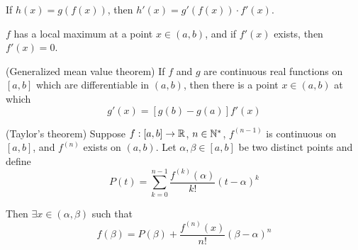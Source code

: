     \begin{theo}
        If $h(x) = g(f(x))$, then $h'(x) = g'(f(x)) \cdot f'(x)$.
    \end{theo}

    \begin{theo}
        $f$ has a local maximum at a point $x \in (a, b)$, and if $f'(x)$ exists, then $f'(x) = 0$.
    \end{theo}

    \begin{theo}
        (Generalized mean value theorem) If $f$ and $g$ are continuous real functions on $[a,b]$ which are differentiable in $(a,b)$, then there is a point $x \in (a,b)$ at which 
        \begin{equation}
            [f(b)-f(a)] g'(x) = [g(b)-g(a)] f'(x)
        \end{equation}
    \end{theo}

    \begin{theo}
        (Taylor's theorem) Suppose $f : [a,b] \to \mathbb{R}$, $n \in \mathbb{N}^*$, $f^{(n-1)}$ is continuous on $[a,b]$, and $f^{(n)}$ exists on $(a,b)$. Let $\alpha, \beta \in [a,b]$ be two distinct points and define
        \begin{equation}
            P(t) = \sum_{k=0}^{n-1} \frac{f^{(k)}(\alpha)}{k!} (t-\alpha)^k
        \end{equation}

        Then $\exists x \in (\alpha, \beta)$ such that 
        \begin{equation}
            f(\beta) = P(\beta) + \frac{f^{(n)}(x)}{n!} (\beta-\alpha)^n
        \end{equation}
    \end{theo}

